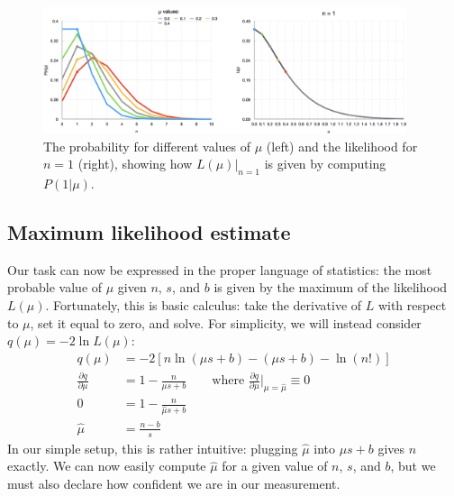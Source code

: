 \begin{figure}[htb]
    \centering
    \includegraphics[width=0.95\textwidth]{fig/stats/prob_vs_like.png}
    \caption[The probability and likelihood]{
        The probability for different values of $\mu$ (left) and the likelihood for $n = 1$ (right), showing how $L(\mu)|_{n=1}$ is given by computing $P(1|\mu)$. 
    }
    \label{fig:prob_vs_like}
\end{figure}

\subsection{Maximum likelihood estimate}
Our task can now be expressed in the proper language of statistics: the most probable value of $\mu$ given $n$, $s$, and $b$ is given by the maximum of the likelihood $L(\mu)$. 
Fortunately, this is basic calculus: take the derivative of $L$ with respect to $\mu$, set it equal to zero, and solve. 
For simplicity, we will instead consider $q(\mu) = -2\ln{L(\mu)}$:
\begin{align}
    q(\mu) &= -2[n\ln(\mu s + b) - (\mu s + b) - \ln{(n!)}] \nonumber \\
    \frac{\partial q}{\partial \mu} &= 1 - \frac{n}{\mu s + b}\qquad\text{where }\frac{\partial q}{\partial \mu}\bigg|_{\mu=\hat{\mu}} \equiv 0 \nonumber \\
    0 &= 1 - \frac{n}{\hat{\mu} s + b} \nonumber \\
    \hat{\mu} &= \frac{n - b}{s}
\end{align}
In our simple setup, this is rather intuitive: plugging $\hat{\mu}$ into $\mu s + b$ gives $n$ exactly. 
We can now easily compute $\hat{\mu}$ for a given value of $n$, $s$, and $b$, but we must also declare how confident we are in our measurement.

